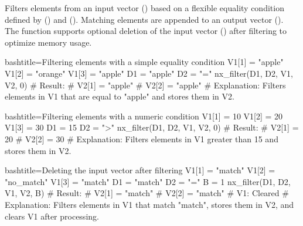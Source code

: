 \begin{NexMainBox}
	\begin{NexMainBox}
		Filters elements from an input vector () based on a flexible equality condition defined by () and (). Matching elements are appended to an output vector (). The function supports optional deletion of the input vector () after filtering to optimize memory usage.
	\end{NexMainBox}
	\begin{NexMainBox}
		\begin{NexListDark}
		\end{NexListDark}
	\end{NexMainBox}
\end{NexMainBox}

\begin{NexCodeBox}{bash}{title={Filtering elements with a simple equality condition}}
	V1[1] = "apple"
	V1[2] = "orange"
	V1[3] = "apple"
	D1 = "apple"
	D2 = "="
	nx_filter(D1, D2, V1, V2, 0)
	# Result:
	# V2[1] = "apple"
	# V2[2] = "apple"
	# Explanation: Filters elements in V1 that are equal to "apple" and stores them in V2.
\end{NexCodeBox}

\begin{NexCodeBox}{bash}{title={Filtering elements with a numeric condition}}
	V1[1] = 10
	V1[2] = 20
	V1[3] = 30
	D1 = 15
	D2 = ">"
	nx_filter(D1, D2, V1, V2, 0)
	# Result:
	# V2[1] = 20
	# V2[2] = 30
	# Explanation: Filters elements in V1 greater than 15 and stores them in V2.
\end{NexCodeBox}

\begin{NexCodeBox}{bash}{title={Deleting the input vector after filtering}}
	V1[1] = "match"
	V1[2] = "no_match"
	V1[3] = "match"
	D1 = "match"
	D2 = "="
	B = 1
	nx_filter(D1, D2, V1, V2, B)
	# Result:
	# V2[1] = "match"
	# V2[2] = "match"
	# V1: Cleared
	# Explanation: Filters elements in V1 that match "match", stores them in V2, and clears V1 after processing.
\end{NexCodeBox}

